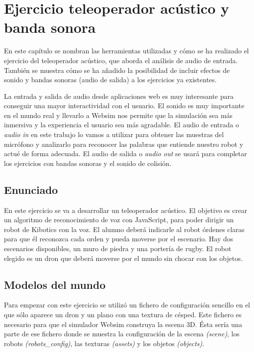 \chapter{Ejercicio teleoperador acústico y banda sonora}\label{audio}
En este capítulo se nombran las herramientas utilizadas y cómo se ha realizado el ejercicio del teleoperador acústico, que aborda el análisis de audio de entrada. También se muestra cómo se ha añadido la posibilidad de incluir efectos de sonido y bandas sonoras (audio de salida) a los ejercicios ya existentes.

La entrada y salida de audio desde aplicaciones web es muy interesante para conseguir una mayor interactividad con el usuario. El sonido es muy importante en el mundo real y llevarlo a Websim nos permite que la simulación sea más inmersiva y la experiencia el usuario sea más agradable.
 El audio de entrada o \textit{audio in} en este trabajo  lo vamos a utilizar para obtener las muestras del micrófono y analizarlo  para reconocer las palabras que entiende nuestro robot y  actué de forma adecuada. El audio de salida o \textit{audio out} se usará para completar los ejercicios con bandas sonoras y el sonido de colisión.

\section{Enunciado}  
En este ejercicio se va a desarrollar un teleoperador acústico. El objetivo es crear un algoritmo de reconocimiento de voz con JavaScript, para poder dirigir un robot de Kibotics con la voz.
El alumno deberá indicarle  al robot órdenes claras para que él reconozca cada orden  y pueda moverse por el escenario. Hay dos escenarios disponibles, un muro de piedra y una portería de rugby. El robot elegido es un dron que deberá moverse por el mundo sin chocar con los objetos.

\section{Modelos del mundo }
Para empezar con este ejercicio se utilizó un fichero de configuración sencillo en el que sólo aparece un dron y un plano con una textura de césped. Este fichero es necesario para que el simulador Websim construya la escena 3D. 
Ésta sería una parte de ese fichero donde se muestra la configuración de la escena \textit{(scene)}, los robots \textit {(robots\_config)}, las texturas \textit{(assets)} y los objetos \textit{(objects)}.

